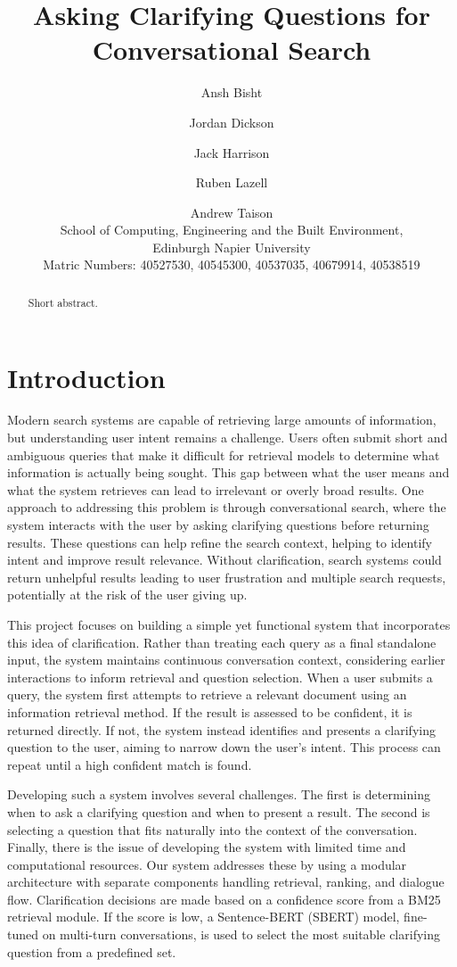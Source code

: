 \documentclass[11pt]{article}
\title{Asking Clarifying Questions for Conversational Search}
\author{
  Ansh Bisht \and
  Jordan Dickson \and
  Jack Harrison \and
  Ruben Lazell \and
  Andrew Taison  \\
  School of Computing, Engineering and the Built Environment, \\
  Edinburgh Napier University \\
  Matric Numbers: 40527530, 40545300, 40537035, 40679914, 40538519
}
\begin{document}
\maketitle
\begin{abstract}
Short abstract.
\end{abstract}


\section{Introduction}
Modern search systems are capable of retrieving large amounts of information, but understanding user intent remains a challenge. Users often submit short and ambiguous queries that make it difficult for retrieval models to determine what information is actually being sought. This gap between what the user means and what the system retrieves can lead to irrelevant or overly broad results. One approach to addressing this problem is through conversational search, where the system interacts with the user by asking clarifying questions before returning results. These questions can help refine the search context, helping to identify intent and improve result relevance. Without clarification, search systems could return unhelpful results leading to user frustration and multiple search requests, potentially at the risk of the user giving up.

This project focuses on building a simple yet functional system that incorporates this idea of clarification. Rather than treating each query as a final standalone input, the system maintains continuous conversation context, considering earlier interactions to inform retrieval and question selection. When a user submits a query, the system first attempts to retrieve a relevant document using an information retrieval method. If the result is assessed to be confident, it is returned directly. If not, the system instead identifies and presents a clarifying question to the user, aiming to narrow down the user's intent. This process can repeat until a high confident match is found.

Developing such a system involves several challenges. The first is determining when to ask a clarifying question and when to present a result. The second is selecting a question that fits naturally into the context of the conversation. Finally, there is the issue of developing the system with limited time and computational resources. Our system addresses these by using a modular architecture with separate components handling retrieval, ranking, and dialogue flow. Clarification decisions are made based on a confidence score from a BM25 retrieval module. If the score is low, a Sentence-BERT (SBERT) model, fine-tuned on multi-turn conversations, is used to select the most suitable clarifying question from a predefined set.
\end{document}
